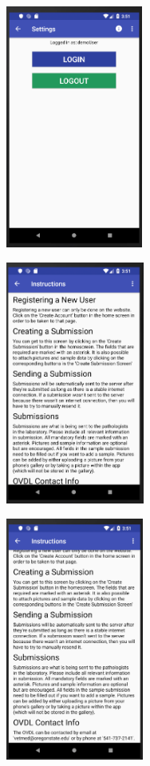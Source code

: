 \documentclass[onecolumn, draftclsnofoot,10pt, compsoc]{IEEEtran}
\begin{document}
\begin{center}
\includegraphics[height=8cm]{Beta_settings_3.png}
\end{center}

\begin{center}
\includegraphics[height=8cm]{Beta_inscructions_1.png}
\end{center}

\begin{center}
\includegraphics[height=8cm]{Beta_instructions_2.png}
\end{center}
\end{document}
